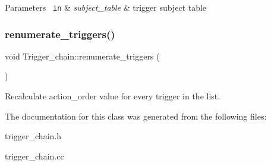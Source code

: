 \begin{DoxyParams}[1]{Parameters}
\mbox{\texttt{ in}}  & {\em subject\+\_\+table} & trigger subject table \\
\hline
\end{DoxyParams}
\mbox{\label{classTrigger__chain_aca447515b99afd1414d05bb7e83b249e}} 
\subsubsection{\texorpdfstring{renumerate\+\_\+triggers()}{renumerate\_triggers()}}
{\footnotesize\ttfamily void Trigger\+\_\+chain\+::renumerate\+\_\+triggers (\begin{DoxyParamCaption}{ }\end{DoxyParamCaption})}

Recalculate action\+\_\+order value for every trigger in the list. 

The documentation for this class was generated from the following files\+:\begin{DoxyCompactItemize}
\item 
trigger\+\_\+chain.\+h\item 
trigger\+\_\+chain.\+cc\end{DoxyCompactItemize}
